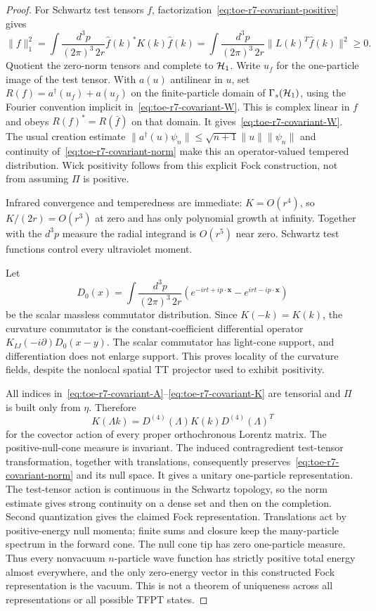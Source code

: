 \begin{proof}
For Schwartz test tensors $f$, factorization~\eqref{eq:toe-r7-covariant-positive} gives
\begin{equation}
 \|f\|_1^2=\int\frac{d^3p}{(2\pi)^3\,2r}
 \widehat f(k)^*K(k)\widehat f(k)
 =\int\frac{d^3p}{(2\pi)^3\,2r}
 \|L(k)^T\widehat f(k)\|^2\geq0.
 \label{eq:toe-r7-covariant-norm}
\end{equation}
Quotient the zero-norm tensors and complete to $\mathcal H_1$.
Write $u_f$ for the one-particle image of the test tensor. With $a(u)$
antilinear in $u$, set $R(f)=a^\dagger(u_f)+a(u_{\bar f})$ on the
finite-particle domain of $\Gamma_s(\mathcal H_1)$, using the Fourier convention
implicit in~\eqref{eq:toe-r7-covariant-W}. This is complex linear in $f$ and obeys
$R(f)^*=R(\bar f)$ on that domain. It gives~\eqref{eq:toe-r7-covariant-W}. The usual creation
estimate $\|a^\dagger(u)\psi_n\|\leq\sqrt{n+1}\|u\|\|\psi_n\|$
and continuity of~\eqref{eq:toe-r7-covariant-norm} make this an operator-valued tempered
distribution. Wick positivity follows from this explicit Fock
construction, not from assuming $\Pi$ is positive.

Infrared convergence and temperedness are immediate: $K=O(r^4)$,
so $K/(2r)=O(r^3)$ at zero and has only polynomial growth at infinity.
Together with the $d^3p$ measure the radial integrand is $O(r^5)$ near zero.
Schwartz test functions control every ultraviolet moment.

Let
\[
 D_0(x)=\int\frac{d^3p}{(2\pi)^3\,2r}
 (e^{-irt+ip\cdot\mathbf x}-e^{irt-ip\cdot\mathbf x})
\]
be the scalar massless commutator distribution. Since $K(-k)=K(k)$,
the curvature commutator is the constant-coefficient differential operator
$K_{IJ}(-i\partial)D_0(x-y)$. The scalar commutator has light-cone support,
and differentiation does not enlarge support. This proves locality of the
curvature fields, despite the nonlocal spatial TT projector used to exhibit
positivity.

All indices in~\eqref{eq:toe-r7-covariant-A}--\eqref{eq:toe-r7-covariant-K} are tensorial and $\Pi$ is built
only from $\eta$. Therefore
\begin{equation}
 K(\Lambda k)=D^{(4)}(\Lambda)K(k)D^{(4)}(\Lambda)^T
 \label{eq:toe-r7-covariant-boost}
\end{equation}
for the covector action of every proper orthochronous Lorentz matrix.
The positive-null-cone measure is invariant. The induced contragredient
test-tensor transformation, together with translations, consequently
preserves~\eqref{eq:toe-r7-covariant-norm} and its null space. It gives a unitary
one-particle representation. The test-tensor action is continuous in the
Schwartz topology, so the norm estimate gives strong continuity on a
dense set and then on the completion. Second quantization gives the claimed
Fock representation. Translations act by positive-energy null momenta;
finite sums and closure keep the many-particle spectrum in the forward cone.
The null cone tip has zero one-particle measure. Thus every nonvacuum
$n$-particle wave function has strictly positive total energy almost
everywhere, and the only zero-energy vector in this constructed Fock
representation is the vacuum. This is not a theorem of uniqueness across
all representations or all possible TFPT states.


\end{proof}
